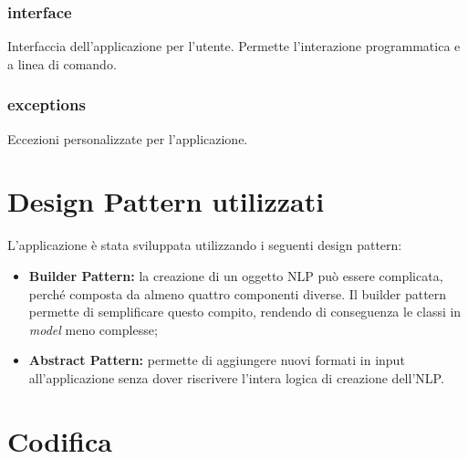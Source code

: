 \subsubsection{interface} %
Interfaccia dell'applicazione per l'utente. Permette l'interazione programmatica e a linea di comando.

\begin{namespacedesc}
\end{namespacedesc}

\subsubsection{exceptions} %
Eccezioni personalizzate per l'applicazione.

\begin{namespacedesc}
\end{namespacedesc}

\section{Design Pattern utilizzati}
L'applicazione è stata sviluppata utilizzando i seguenti design pattern:
\begin{itemize}
    \item \textbf{Builder Pattern:} la creazione di un oggetto NLP può essere complicata, perché composta da almeno quattro componenti diverse. Il builder pattern permette di semplificare questo compito, rendendo di conseguenza le classi in \textit{model} meno complesse;
    \item \textbf{Abstract Pattern:} permette di aggiungere nuovi formati in input all'applicazione senza dover riscrivere l'intera logica di creazione dell'NLP.
\end{itemize}

\section{Codifica}\label{sec:codifica}
